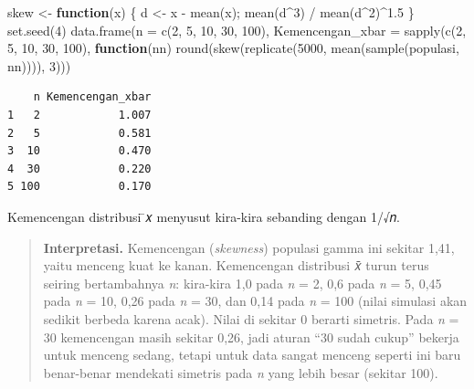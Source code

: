 \documentclass[
  indonesian,
  letterpaper,
]{book}
\newenvironment{Shaded}{\begin{snugshade}}{\end{snugshade}}
\newcommand{\AttributeTok}[1]{\textcolor[rgb]{0.40,0.45,0.13}{#1}}
\newcommand{\ControlFlowTok}[1]{\textcolor[rgb]{0.00,0.23,0.31}{\textbf{#1}}}
\newcommand{\DecValTok}[1]{\textcolor[rgb]{0.68,0.00,0.00}{#1}}
\newcommand{\FloatTok}[1]{\textcolor[rgb]{0.68,0.00,0.00}{#1}}
\newcommand{\FunctionTok}[1]{\textcolor[rgb]{0.28,0.35,0.67}{#1}}
\newcommand{\NormalTok}[1]{\textcolor[rgb]{0.00,0.23,0.31}{#1}}
\newcommand{\OtherTok}[1]{\textcolor[rgb]{0.00,0.23,0.31}{#1}}
\newcommand{\SpecialCharTok}[1]{\textcolor[rgb]{0.37,0.37,0.37}{#1}}
\begin{document}
\begin{Shaded}
\begin{Highlighting}[]
\NormalTok{skew }\OtherTok{\textless{}{-}} \ControlFlowTok{function}\NormalTok{(x) \{ d }\OtherTok{\textless{}{-}}\NormalTok{ x }\SpecialCharTok{{-}} \FunctionTok{mean}\NormalTok{(x); }\FunctionTok{mean}\NormalTok{(d}\SpecialCharTok{\^{}}\DecValTok{3}\NormalTok{) }\SpecialCharTok{/} \FunctionTok{mean}\NormalTok{(d}\SpecialCharTok{\^{}}\DecValTok{2}\NormalTok{)}\SpecialCharTok{\^{}}\FloatTok{1.5}\NormalTok{ \}}
\FunctionTok{set.seed}\NormalTok{(}\DecValTok{4}\NormalTok{)}
\FunctionTok{data.frame}\NormalTok{(}\AttributeTok{n =} \FunctionTok{c}\NormalTok{(}\DecValTok{2}\NormalTok{, }\DecValTok{5}\NormalTok{, }\DecValTok{10}\NormalTok{, }\DecValTok{30}\NormalTok{, }\DecValTok{100}\NormalTok{),}
\AttributeTok{Kemencengan\_xbar =} \FunctionTok{sapply}\NormalTok{(}\FunctionTok{c}\NormalTok{(}\DecValTok{2}\NormalTok{, }\DecValTok{5}\NormalTok{, }\DecValTok{10}\NormalTok{, }\DecValTok{30}\NormalTok{, }\DecValTok{100}\NormalTok{), }\ControlFlowTok{function}\NormalTok{(nn)}
\FunctionTok{round}\NormalTok{(}\FunctionTok{skew}\NormalTok{(}\FunctionTok{replicate}\NormalTok{(}\DecValTok{5000}\NormalTok{, }\FunctionTok{mean}\NormalTok{(}\FunctionTok{sample}\NormalTok{(populasi, nn)))), }\DecValTok{3}\NormalTok{)))}
\end{Highlighting}
\end{Shaded}

\begin{verbatim}
    n Kemencengan_xbar
1   2            1.007
2   5            0.581
3  10            0.470
4  30            0.220
5 100            0.170
\end{verbatim}

Kemencengan distribusi ̄𝑥 menyusut kira-kira sebanding dengan 1/√𝑛.

\begin{quote}
\textbf{Interpretasi.} Kemencengan (\emph{skewness}) populasi gamma ini
sekitar 1,41, yaitu menceng kuat ke kanan. Kemencengan distribusi 𝑥̄
turun terus seiring bertambahnya \emph{n}: kira-kira 1,0 pada \emph{n} =
2, 0,6 pada \emph{n} = 5, 0,45 pada \emph{n} = 10, 0,26 pada \emph{n} =
30, dan 0,14 pada \emph{n} = 100 (nilai simulasi akan sedikit berbeda
karena acak). Nilai di sekitar 0 berarti simetris. Pada \emph{n} = 30
kemencengan masih sekitar 0,26, jadi aturan ``30 sudah cukup'' bekerja
untuk menceng sedang, tetapi untuk data sangat menceng seperti ini baru
benar-benar mendekati simetris pada \emph{n} yang lebih besar (sekitar
100).
\end{quote}
\end{document}
